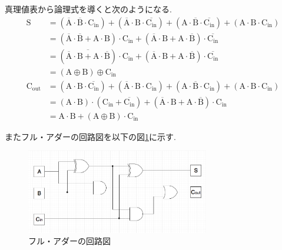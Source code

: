 \documentclass[a4paper, 11pt, uplatex]{jsarticle}
\begin{document}
真理値表から論理式を導くと次のようになる.
\begin{align}
  \mathrm{S} &= (\overline{\mathrm{A}} \cdot \overline{\mathrm{B}} \cdot \mathrm{C_{in}})
   + (\overline{\mathrm{A}} \cdot \mathrm{B} \cdot \overline{\mathrm{C_{in}}})
   + (\mathrm{A} \cdot \overline{\mathrm{B}} \cdot \overline{\mathrm{C_{in}}})
   + (\mathrm{A} \cdot \mathrm{B} \cdot \mathrm{C_{in}}) \\
   &= (\overline{\mathrm{A}} \cdot \overline{\mathrm{B}} + \mathrm{A} \cdot \mathrm{B}) \cdot \mathrm{C_{in}} + (\overline{\mathrm{A}} \cdot \mathrm{B} + \mathrm{A} \cdot \overline{\mathrm{B}}) \cdot \overline{\mathrm{C_{in}}}  \\
   &= (\overline{\overline{\mathrm{A}} \cdot \mathrm{B} + \mathrm{A} \cdot \overline{\mathrm{B}}}) \cdot \mathrm{C_{in}} + (\overline{\mathrm{A}} \cdot \mathrm{B} + \mathrm{A} \cdot \overline{\mathrm{B}}) \cdot \overline{\mathrm{C_{in}}} \\
   &= (\mathrm{A} \oplus \mathrm{B}) \oplus \mathrm{C_{in}} \\
  \mathrm{\mathrm{C_{out}}} &= (\mathrm{A} \cdot \mathrm{B} \cdot \overline{\mathrm{C_{in}}})
  + (\overline{\mathrm{A}} \cdot \mathrm{B} \cdot \mathrm{C_{in}})
  + (\mathrm{A} \cdot \overline{\mathrm{B}} \cdot \mathrm{C_{in}})
  + (\mathrm{A} \cdot \mathrm{B} \cdot \mathrm{C_{in}}) \\
   &= (\mathrm{A} \cdot \mathrm{B}) \cdot (\mathrm{C_{in}} + \overline{\mathrm{C_{in}}}) + (\overline{\mathrm{A}} \cdot \mathrm{B} + \mathrm{A} \cdot \overline{\mathrm{B}}) \cdot \mathrm{C_{in}}\\
   &=\mathrm{A} \cdot \mathrm{B} + (\mathrm{A} \oplus \mathrm{B}) \cdot \mathrm{C_{in}}
\end{align}

またフル・アダーの回路図を以下の図\ref{フルアダー}に示す.
\begin{figure}[H]
  \begin{center}
    \includegraphics[width = 8cm]{画像/フルアダー.png}
    \caption{フル・アダーの回路図}
    \label{フルアダー}
  \end{center}
\end{figure}
\end{document}
